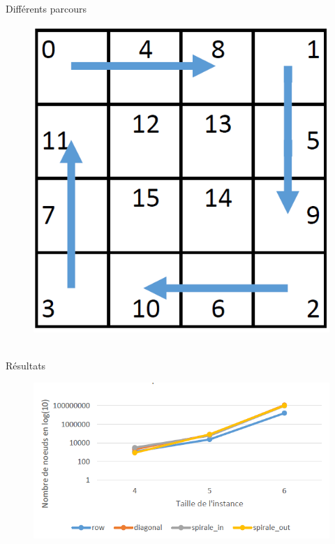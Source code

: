 \begin{frame}[plain]{Différents parcours}
\begin{figure}[H]
				\includegraphics[width=\linewidth]{images/parcours_quad-spiral-in.png}
				\endminipage\hfill
				\ %
				\endminipage\hfill
			\end{figure}
	\end{frame}
	\begin{frame}{Résultats}
		\begin{figure}
			\includegraphics[width=\textwidth]{images/resultat_bruteforce_graphique_all}
		\end{figure}
	\end{frame}
